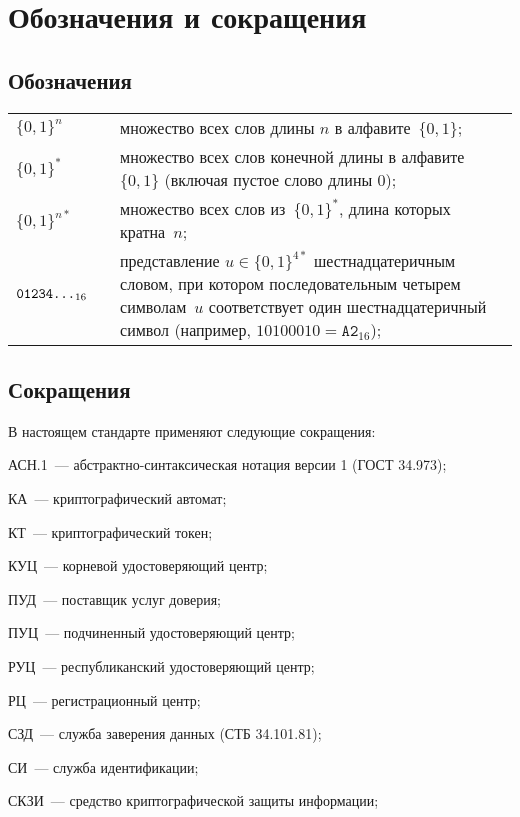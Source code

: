 \chapter{Обозначения и сокращения}\label{DEFS}

\section{Обозначения}

{\tabcolsep 0pt
\begin{longtable}{lrp{13.5cm}}
$\{0,1\}^n$  & \hspace{2mm} &
множество всех слов длины $n$ в алфавите~$\{0,1\}$;
\\[4pt]
$\{0,1\}^*$  &&
множество всех слов конечной длины в алфавите~$\{0,1\}$
(включая пустое слово длины $0$);
\\[4pt]
%
$\{0,1\}^{n*}$  &&
множество всех слов из~$\{0,1\}^*$,
длина которых кратна~$n$;
\\[4pt]
%
$\texttt{01234\ldots}_{16}$ && 
представление $u\in\{0,1\}^{4*}$ шестнадцатеричным словом,
при котором последовательным четырем символам~$u$ соответствует
один шестнадцатеричный символ
(например, $10100010=\texttt{A2}_{16}$);
\\[4pt]
\end{longtable}
} %
\setcounter{table}{0}

\section{Сокращения}

В настоящем стандарте применяют следующие сокращения:

АСН.1~--- абстрактно-синтаксическая нотация версии 1 (ГОСТ 34.973);

КА~--- криптографический автомат;

КТ~--- криптографический токен;

КУЦ~--- корневой удостоверяющий центр;

ПУД~--- поставщик услуг доверия;

ПУЦ~--- подчиненный удостоверяющий центр;

РУЦ~--- республиканский удостоверяющий центр;

РЦ~--- регистрационный центр;

СЗД~--- служба заверения данных (СТБ 34.101.81);

СИ~--- служба идентификации;

СКЗИ~--- средство криптографической защиты информации;

